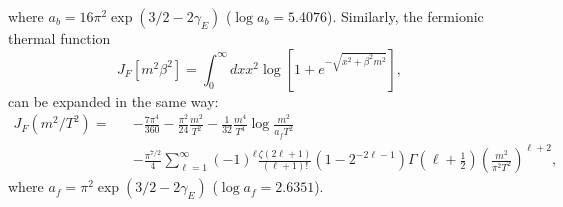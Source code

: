 where $a_b=16\pi^2 \exp (3/2-2\gamma_E)$ ($\log a_b = 5.4076$). Similarly, the fermionic thermal function
\begin{equation}
J_F[m^2\beta^2] = \int^{\infty}_0 dx x^2 \log \left[ 1+e^{-\sqrt{x^2+\beta^2 m^2}}\right],
\label{eqn:JF}
\end{equation}
can be expanded in the same way:
\begin{eqnarray}
J_F (m^2/T^2) = &&-\frac{7\pi^4}{360} - \frac{\pi^2}{24}\frac{m^2}{T^2} -\frac{1}{32}\frac{m^4}{T^4} \log \frac{m^2}{a_f T^2} \nonumber \\
&& -\frac{\pi^{7/2}}{4} \sum^{\infty}_{\ell=1} (-1)^{\ell} \frac{\zeta(2\ell +1)}{(\ell+1)!} (1-2^{-2\ell-1})\Gamma \left(\ell+\frac{1}{2} \right) \left( \frac{m^2}{\pi^2 T^2}\right)^{\ell+2},
\end{eqnarray}
where $a_f=\pi^2 \exp (3/2-2\gamma_E)$ ($\log a_f = 2.6351$). 

